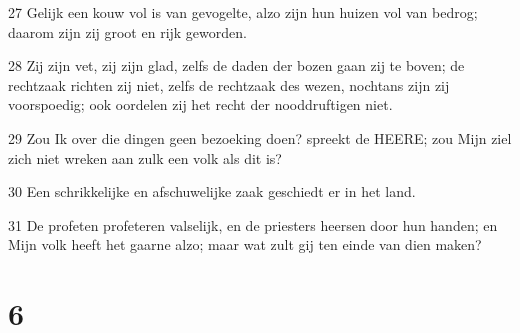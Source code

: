 \par 27 Gelijk een kouw vol is van gevogelte, alzo zijn hun huizen vol van bedrog; daarom zijn zij groot en rijk geworden.
\par 28 Zij zijn vet, zij zijn glad, zelfs de daden der bozen gaan zij te boven; de rechtzaak richten zij niet, zelfs de rechtzaak des wezen, nochtans zijn zij voorspoedig; ook oordelen zij het recht der nooddruftigen niet.
\par 29 Zou Ik over die dingen geen bezoeking doen? spreekt de HEERE; zou Mijn ziel zich niet wreken aan zulk een volk als dit is?
\par 30 Een schrikkelijke en afschuwelijke zaak geschiedt er in het land.
\par 31 De profeten profeteren valselijk, en de priesters heersen door hun handen; en Mijn volk heeft het gaarne alzo; maar wat zult gij ten einde van dien maken?

\chapter{6}

